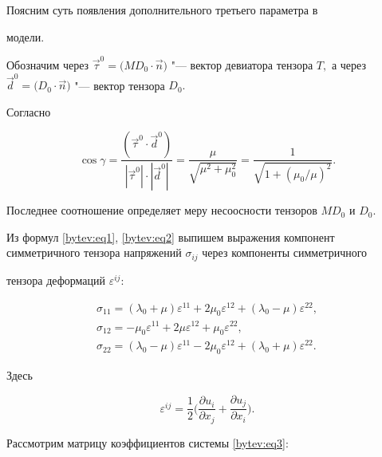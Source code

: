 Поясним суть появления дополнительного третьего параметра в

модели.

Обозначим через $\overrightarrow{\tau}^{0}=\big(MD_{0}\cdot\overrightarrow{n}\big)$ "--- вектор девиатора тензора $T,$ а через $\overrightarrow{d}^{0}=\big(D_{0}\cdot\overrightarrow{n}\big)$ "---  вектор тензора $D_{0}.$ 

Согласно \cite{Andreev}

$$\cos{\gamma}=\frac{(\overrightarrow{\tau}^{0}\cdot\overrightarrow{d}^{0})}

{|\overrightarrow{\tau}^{0}|\cdot|\overrightarrow{d}^{0}|}=\frac{\mu}{\sqrt{\mu^{2}+\mu_{0}^{2}}}=

\frac{1}{\sqrt{1+(\mu_{0}/\mu)^{2}}}.$$

Последнее соотношение определяет меру несоосности тензоров $MD_{0}$  и $D_{0}$.



Из формул \eqref{bytev:eq1}, \eqref{bytev:eq2} выпишем выражения компонент симметричного тензора напряжений $\sigma_{ij}$ через компоненты симметричного

тензора деформаций $\varepsilon^{ij}$:

\begin{equation}

\label{bytev:eq3}

\begin{array}{l}

\sigma_{11}=(\lambda_{0}+\mu)\varepsilon^{11}+2\mu_{0}\varepsilon^{12}+(\lambda_{0}-\mu)\varepsilon^{22},\\

\sigma_{12}=-\mu_{0}\varepsilon^{11}+2\mu\varepsilon^{12}+\mu_{0}\varepsilon^{22},\\

\sigma_{22}=(\lambda_{0}-\mu)\varepsilon^{11}-2\mu_{0}\varepsilon^{12}+(\lambda_{0}+\mu)\varepsilon^{22}.

\end{array}

\end{equation}

Здесь

$$\varepsilon^{ij}=\displaystyle

\frac{1}{2}\bigg(\frac{\partial u_{i}}{\partial

x_{j}}+\frac{\partial u_{j}}{\partial x_{i}}\bigg).$$



Рассмотрим матрицу коэффициентов системы \eqref{bytev:eq3}:

